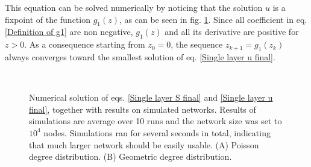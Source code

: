 \documentclass[
11pt, %
english, %
singlespacing, %
nolistspacing, %
liststotoc, %
headsepline, %
]{MastersDoctoralThesis} %
\begin{document}
This equation can be solved numerically by noticing that the solution $u$ is a fixpoint of the function $g_1(z)$, as can be seen in fig. \ref{Figure: Solution of of u = g1(u) graphically}. Since all coefficient in eq. \eqref{Definition of g1} are non negative, $g_1(z)$ and all its derivative are positive for $z > 0$. As a consequence starting from $z_0 = 0$, the sequence $z_{k + 1}  = g_1(z_k)$ always converges toward the smallest solution of eq. \eqref{Single layer u final}.

\begin{figure}
	\caption{}
	\label{Figure: Solution of of u = g1(u) graphically}
\end{figure}

{
\begin{figure}
	\\
	\caption{Numerical solution of eqs. \eqref{Single layer S final} and \eqref{Single layer u final}, together with results on simulated networks. Results of simulations are average over 10 runs and the network size was set to $10^4$ nodes. Simulations ran for several seconds in total, indicating that much larger network should be easily usable. (A) Poisson degree distribution. (B) Geometric degree distribution.}
\end{figure}
}
\end{document}
